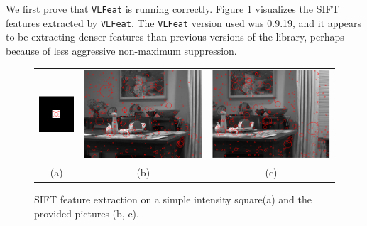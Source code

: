 \documentclass[11pt]{article} %
\begin{document}
We first prove that \texttt{VLFeat} is running correctly. Figure \ref{fig:SIFT_feat} visualizes the SIFT features extracted by \texttt{VLFeat}. The \texttt{VLFeat} version used was 0.9.19, and it appears to be extracting denser features than previous versions of the library, perhaps because of less aggressive non-maximum suppression. 

\begin{figure}[H]
	\centering
	\begin{tabular}{ccc}
		\includegraphics[scale=1.3]{figures/sift_square.png} & 
		\includegraphics[scale=.4]{figures/sift_left.png} &
		\includegraphics[scale=.4]{figures/sift_right.png} \\ 
		(a) & (b) &(c)
	\end{tabular}
\caption{SIFT feature extraction on a simple intensity square(a) and the provided pictures (b, c).}
\label{fig:SIFT_feat}
\end{figure}
\end{document}
